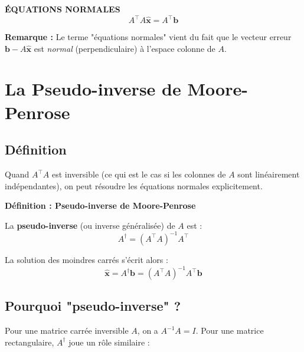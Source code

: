 \documentclass[12pt,a4paper]{article}
\newcommand{\T}{^\top}
\newcommand{\pinv}{^\dagger}
\begin{document}
\begin{resultatbox}
\begin{center}
\textbf{\textcolor{bleu}{ÉQUATIONS NORMALES}}
\begin{equation}
\boxed{A\T A \hat{\mathbf{x}} = A\T \mathbf{b}}
\end{equation}
\end{center}
\end{resultatbox}

\vspace{0.3cm}

\textbf{Remarque :} Le terme "équations normales" vient du fait que le vecteur erreur $\mathbf{b} - A\hat{\mathbf{x}}$ est \textit{normal} (perpendiculaire) à l'espace colonne de $A$.

\newpage
\section{La Pseudo-inverse de Moore-Penrose}

\subsection{Définition}

Quand $A\T A$ est inversible (ce qui est le cas si les colonnes de $A$ sont linéairement indépendantes), on peut résoudre les équations normales explicitement.

\begin{theorembox}
\textbf{Définition : Pseudo-inverse de Moore-Penrose}

La \textbf{pseudo-inverse} (ou inverse généralisée) de $A$ est :
\begin{equation}
\boxed{A\pinv = (A\T A)^{-1} A\T}
\end{equation}

La solution des moindres carrés s'écrit alors :
\begin{equation}
\boxed{\hat{\mathbf{x}} = A\pinv \mathbf{b} = (A\T A)^{-1} A\T \mathbf{b}}
\end{equation}
\end{theorembox}

\subsection{Pourquoi "pseudo-inverse" ?}

Pour une matrice carrée inversible $A$, on a $A^{-1} A = I$. Pour une matrice rectangulaire, $A\pinv$ joue un rôle similaire :
\end{document}

